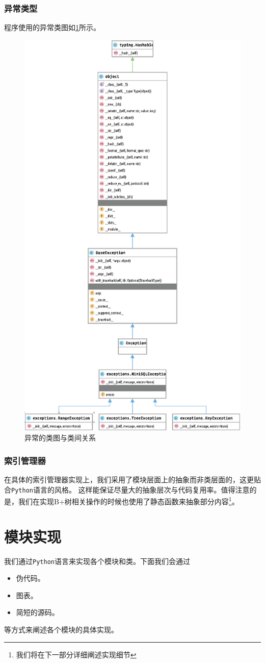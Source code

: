 \documentclass[UTF8]{ctexrep} %
\begin{document}
\subsection{异常类型}
程序使用的异常类图如\ref{fig:exceptions_diagram}所示。
\begin{figure}[H]
    \centering
    \includegraphics[width=0.5\linewidth]{figure/exceptions.eps}
    \caption{异常的类图与类间关系}
    \label{fig:exceptions_diagram}
\end{figure}
\subsection{索引管理器}
在具体的索引管理器实现上，我们采用了模块层面上的抽象而非类层面的，这更贴合\texttt{Python}语言的风格。
这样能保证尽量大的抽象层次与代码复用率。值得注意的是，我们在实现B+树相关操作的时候也使用了静态函数来抽象部分内容\footnote{我们将在下一部分详细阐述实现细节}。

\chapter{模块实现}
我们通过\texttt{Python}语言来实现各个模块和类。下面我们会通过
\begin{itemize}
    \item 伪代码。
    \item 图表。
    \item 简短的源码。
\end{itemize}
等方式来阐述各个模块的具体实现。
\end{document}
